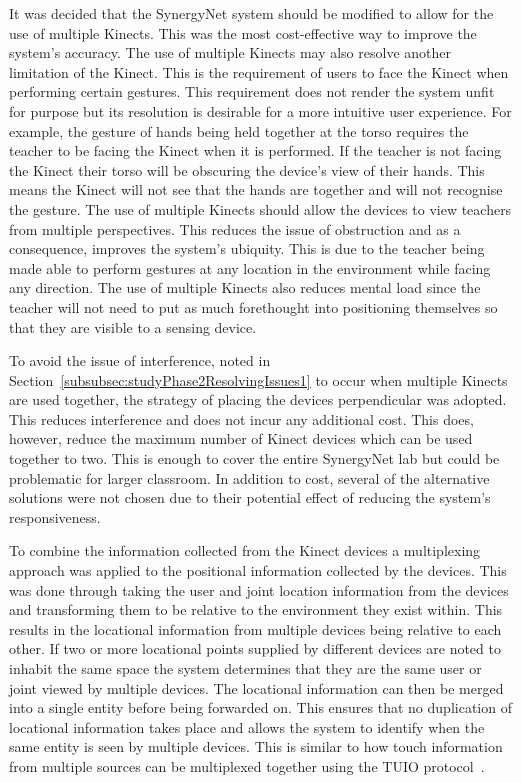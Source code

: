 \documentclass[link]{IWCOMP}
\begin{document}
It was decided that the SynergyNet system should be modified to allow for the use of multiple Kinects.
This was the most cost-effective way to improve the system's accuracy.
The use of multiple Kinects may also resolve another limitation of the Kinect.
This is the requirement of users to face the Kinect when performing certain gestures.
This requirement does not render the system unfit for purpose but its resolution is desirable for a more intuitive user experience.
For example, the gesture of hands being held together at the torso requires the teacher to be facing the Kinect when it is performed.
If the teacher is not facing the Kinect their torso will be obscuring the device's view of their hands.
This means the Kinect will not see that the hands are together and will not recognise the gesture.
The use of multiple Kinects should allow the devices to view teachers from multiple perspectives.
This reduces the issue of obstruction and as a consequence, improves the system's ubiquity.
This is due to the teacher being made able to perform gestures at any location in the environment while facing any direction.
The use of multiple Kinects also reduces mental load since the teacher will not need to put as much forethought into positioning themselves so that they are visible to a sensing device.

To avoid the issue of interference, noted in Section~\ref{subsubsec:studyPhase2ResolvingIssues1} to occur when multiple Kinects are used together, the strategy of placing the devices perpendicular was adopted.
This reduces interference and does not incur any additional cost.
This does, however, reduce the maximum number of Kinect devices which can be used together to two.
This is enough to cover the entire SynergyNet lab but could be problematic for larger classroom.
In addition to cost, several of the alternative solutions were not chosen due to their potential effect of reducing the system's responsiveness.

To combine the information collected from the Kinect devices a multiplexing approach was applied to the positional information collected by the devices.
This was done through taking the user and joint location information from the devices and transforming them to be relative to the environment they exist within.
This results in the locational information from multiple devices being relative to each other.
If two or more locational points supplied by different devices are noted to inhabit the same space the system determines that they are the same user or joint viewed by multiple devices.
The locational information can then be merged into a single entity before being forwarded on.
This ensures that no duplication of locational information takes place and allows the system to identify when the same entity is seen by multiple devices.
This is similar to how touch information from multiple sources can be multiplexed together using the TUIO protocol~\cite{Kaltenbrunner2009}.
\end{document}
